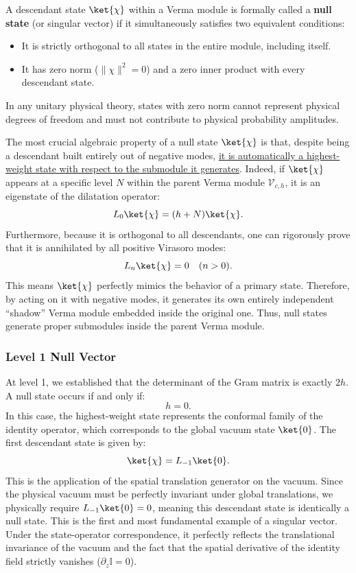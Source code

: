 A descendant state \(\ket{\chi}\) within a Verma module is formally called a \textbf{null state} (or singular vector) if it simultaneously satisfies two equivalent conditions:
\begin{itemize}
    \item It is strictly orthogonal to all states in the entire module, including itself.
    \item It has zero norm (\(\|\chi\|^2 = 0\)) and a zero inner product with every descendant state.
\end{itemize}

In any unitary physical theory, states with zero norm cannot represent physical degrees of freedom and must not contribute to physical probability amplitudes.

The most crucial algebraic property of a null state \(\ket{\chi}\) is that, despite being a descendant built entirely out of negative modes, \uline{it is automatically a highest-weight state with respect to the submodule it generates}. Indeed, if \(\ket{\chi}\) appears at a specific level \(N\) within the parent Verma module \(\mathcal{V}_{c,h}\), it is an eigenstate of the dilatation operator:
\[
    L_0\ket{\chi} = (h + N)\ket{\chi}.
\]
Furthermore, because it is orthogonal to all descendants, one can rigorously prove that it is annihilated by all positive Virasoro modes:
\[
    L_n\ket{\chi} = 0 \quad (n > 0).
\]
This means \(\ket{\chi}\) perfectly mimics the behavior of a primary state. Therefore, by acting on it with negative modes, it generates its own entirely independent ``shadow'' Verma module embedded inside the original one. Thus, null states generate proper submodules inside the parent Verma module.

\subsubsection{Level 1 Null Vector}

At level 1, we established that the determinant of the Gram matrix is exactly \(2h\). A null state occurs if and only if:
\[
    h = 0.
\]
In this case, the highest-weight state represents the conformal family of the identity operator, which corresponds to the global vacuum state \(\ket{0}\). The first descendant state is given by:
\[
    \ket{\chi} = L_{-1} \ket{0}.
\]
This is the application of the spatial translation generator on the vacuum. Since the physical vacuum must be perfectly invariant under global translations, we physically require \(L_{-1} \ket{0} = 0\), meaning this descendant state is identically a null state. This is the first and most fundamental example of a singular vector. Under the state-operator correspondence, it perfectly reflects the translational invariance of the vacuum and the fact that the spatial derivative of the identity field strictly vanishes (\(\partial_z \mathbb{I} = 0\)).

